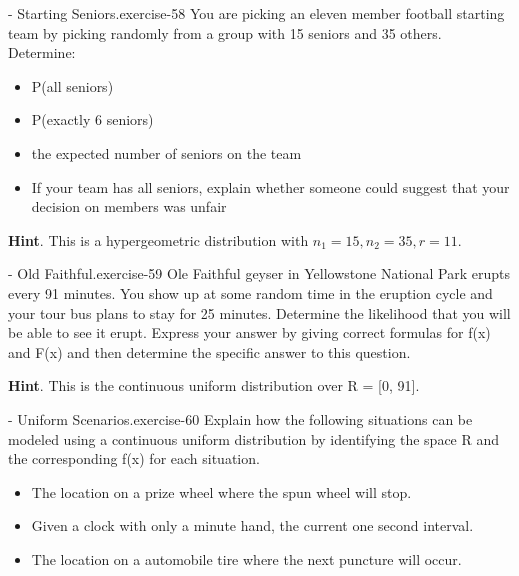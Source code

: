 \documentclass[10pt,]{book}
\numberwithin{equation}{section}
\begin{document}
\begin{inlineexercise}{- Starting Seniors.}{exercise-58}%
\hypertarget{p-862}{}%
You are picking an eleven member football starting team by picking randomly from a group with 15 seniors and 35 others. Determine: \leavevmode%
\begin{itemize}[label=\textbullet]
\item{}P(all seniors)%
\item{}P(exactly 6 seniors)%
\item{}the expected number of seniors on the team%
\item{}If your team has all seniors, explain whether someone could suggest that your decision on members was unfair%
\end{itemize}
%
\par\smallskip%
\noindent\textbf{Hint}.\hypertarget{hint-5}{}\quad%
\hypertarget{p-863}{}%
This is a hypergeometric distribution with \(n_1 = 15, n_2 = 35, r = 11\).%
\end{inlineexercise}
%
\par
\hypertarget{p-864}{}%
\begin{inlineexercise}{- Old Faithful.}{exercise-59}%
\hypertarget{p-865}{}%
Ole Faithful geyser in Yellowstone National Park erupts every 91 minutes. You show up at some random time in the eruption cycle and your tour bus plans to stay for 25 minutes. Determine the likelihood that you will be able to see it erupt.  Express your answer by giving correct formulas for f(x) and F(x) and then determine the specific answer to this question.%
\par\smallskip%
\noindent\textbf{Hint}.\hypertarget{hint-6}{}\quad%
\hypertarget{p-866}{}%
This is the continuous uniform distribution over R = [0, 91].%
\end{inlineexercise}
%
\par
\hypertarget{p-867}{}%
\begin{inlineexercise}{- Uniform Scenarios.}{exercise-60}%
\hypertarget{p-868}{}%
Explain how the following situations can be modeled using a continuous uniform distribution by identifying the space R and the corresponding f(x) for each situation. \leavevmode%
\begin{itemize}[label=\textbullet]
\item{}The location on a prize wheel where the spun wheel will stop.%
\item{}Given a clock with only a minute hand, the current one second interval.%
\item{}The location on a automobile tire where the next puncture will occur.%
\end{itemize}
%
\end{inlineexercise}
\end{document}
